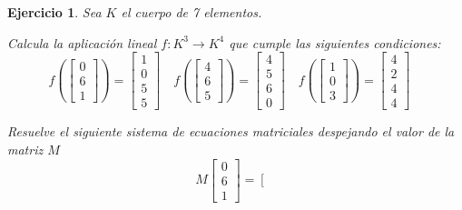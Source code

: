 \documentclass[12pt]{amsart}
\newtheorem{ejer}{Ejercicio}
\begin{document}
\begin{ejer} Sea $K$ el cuerpo de 7 elementos.
\newline
\noindent\begin{minipage}{\textwidth}
\begin{tcolorbox}[colback = green!20!white,title=Versión Aplicación]
Calcula la aplicaci\'on lineal $f:K^{3} \to K^{4}$ que cumple las siguientes condiciones: 
\[f\left(\left[\begin{array}{r}
0 \\
6 \\
1
\end{array}\right]\right) = \left[\begin{array}{r}
1 \\
0 \\
5 \\
5
\end{array}\right] \quad f\left(\left[\begin{array}{r}
4 \\
6 \\
5
\end{array}\right]\right) = \left[\begin{array}{r}
4 \\
5 \\
6 \\
0
\end{array}\right] \quad f\left(\left[\begin{array}{r}
1 \\
0 \\
3
\end{array}\right]\right) = \left[\begin{array}{r}
4 \\
2 \\
4 \\
4
\end{array}\right] \quad 
\]\end{tcolorbox}
\end{minipage} \newline
\noindent\begin{minipage}{\textwidth}
\begin{tcolorbox}[colback = blue!20!white,title=Versión Sistema Matricial]
Resuelve el siguiente sistema de ecuaciones matriciales despejando el valor de la matriz $M$
\[M \left[\begin{array}{r}
0 \\
6 \\
1
\end{array}\right] = \left[\begin{array}{r}

\end{array}\]
\end{tcolorbox}
\end{minipage}
\end{ejer}
\end{document}
